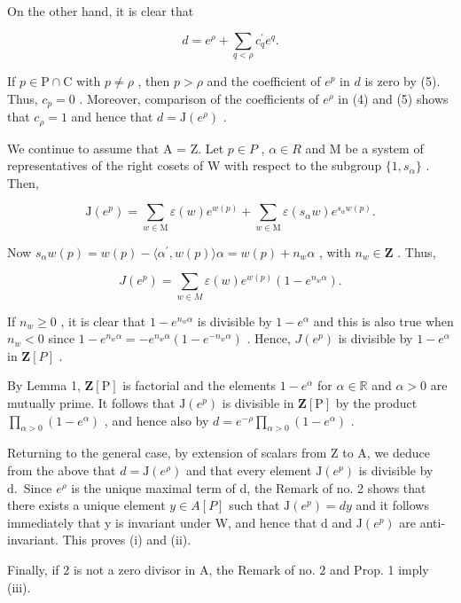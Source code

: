 On the other hand, it is clear that

\[
d = e ^ {\rho} + \sum_ {q <   \rho} c _ {q} ^ {\prime} e ^ {q}.\tag{5}
\]

If \(p \in \mathrm{P} \cap \mathrm{C}\) with \(p \neq \rho\) , then \(p > \rho\) and the coefficient of \(e^p\) in \(d\) is zero by (5). Thus, \(c_p = 0\) . Moreover, comparison of the coefficients of \(e^\rho\) in (4) and (5) shows that \(c_\rho = 1\) and hence that \(d = \mathrm{J}(e^\rho)\) .

We continue to assume that A = Z. Let \(p \in P\) , \(\alpha \in R\) and M be a system of representatives of the right cosets of W with respect to the subgroup \(\{1, s_{\alpha}\}\) . Then,

\[
\mathrm{J} (e ^ {p}) = \sum_ {w \in \mathrm{M}} \varepsilon (w) e ^ {w (p)} + \sum_ {w \in \mathrm{M}} \varepsilon (s _ {\alpha} w) e ^ {s _ {\alpha} w (p)}.
\]

Now \(s_{\alpha}w(p) = w(p) - \langle \alpha^{\prime},w(p)\rangle \alpha = w(p) + n_w\alpha\) , with \(n_w\in \mathbf{Z}\) . Thus,

\[
J (e ^ {p}) = \sum_ {w \in M} \varepsilon (w) e ^ {w (p)} \left(1 - e ^ {n _ {w} \alpha}\right).
\]

If \(n_w \geqslant 0\) , it is clear that \(1 - e^{n_w\alpha}\) is divisible by \(1 - e^\alpha\) and this is also true when \(n_w < 0\) since \(1 - e^{n_w\alpha} = -e^{n_w\alpha}(1 - e^{-n_w\alpha})\) . Hence, \(J(e^p)\) is divisible by \(1 - e^\alpha\) in \(\mathbf{Z}[P]\) .

By Lemma 1, \(\mathbf{Z}[\mathrm{P}]\) is factorial and the elements \(1 - e^{\alpha}\) for \(\alpha \in \mathbb{R}\) and \(\alpha > 0\) are mutually prime. It follows that \(\mathrm{J}(e^{p})\) is divisible in \(\mathbf{Z}[\mathrm{P}]\) by the product \(\prod_{\alpha > 0}(1 - e^{\alpha})\) , and hence also by \(d = e^{-\rho}\prod_{\alpha > 0}(1 - e^{\alpha})\) .

Returning to the general case, by extension of scalars from Z to A, we deduce from the above that \(d = \mathrm{J}(e^{\rho})\) and that every element \(\mathrm{J}(e^{p})\) is divisible by d.~Since \(e^{\rho}\) is the unique maximal term of d, the Remark of no. 2 shows that there exists a unique element \(y \in A[P]\) such that \(\mathrm{J}(e^{p}) = dy\) and it follows immediately that y is invariant under W, and hence that d and \(\mathrm{J}(e^{p})\) are anti-invariant. This proves (i) and (ii).

Finally, if 2 is not a zero divisor in A, the Remark of no. 2 and Prop. 1 imply (iii).

